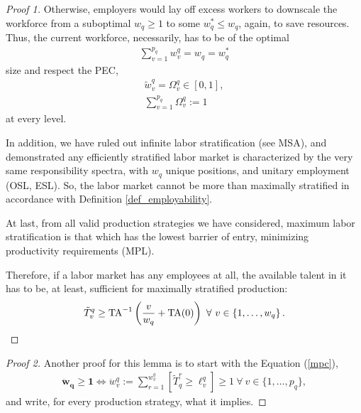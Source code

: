 \documentclass[hidelinks, nonatbib]{elsarticle}
\begin{document}
\begin{lemma}
\begin{proof}[Proof 1]
        Otherwise, employers would lay off excess workers to downscale the workforce from a suboptimal $w_q \geq 1$ to some $w_{q}^{*} \leq w_q$, again, to save resources. Thus, the current workforce, necessarily, has to be of the optimal
        \begin{gather}
        \sum_{v=1}^{p_q}
        w_{v}^{q}
        =
        w_q
        =
        w_{q}^{*}
        \end{gather}
        size and respect the PEC,
        \begin{gather}
        \tilde{w}_{v}^{q}
        =
        \Omega_{v}^{q}
        \in
        [0,1]
        ,
        \\
        \sum_{v=1}^{p_q}
        \Omega_{v}^{q}
        :=
        1
        \end{gather}
        at every level.
        
        In addition, we have ruled out infinite labor stratification (see MSA), and demonstrated any efficiently stratified labor market is characterized by the very same responsibility spectra, with $w_q$ unique positions, and unitary employment (OSL, ESL). So, the labor market cannot be more than maximally stratified in accordance with Definition \ref{def_employability}. 
        
        At last, from all valid production strategies we have considered, maximum labor stratification is that which has the lowest barrier of entry, minimizing productivity requirements (MPL).
        
        Therefore, if a labor market has any employees at all, the available talent in it has to be, at least, sufficient for maximally stratified production:
        \begin{gather}
            \tilde{T}_{v}^{q}
            \geq
            \text{TA}^{-1}\left(
                \frac{v}{w_q}
                +
                \text{TA}(0)
            \right)
            \
            \forall
            \
            v \in 
            \left\{
                1, \dots, w_q
            \right\}
            .
        \end{gather}
    \end{proof}

    \begin{proof}[Proof 2]
        Another proof for this lemma is to start with the Equation (\ref{mpc}),
        \begin{gather}
            \boldsymbol{\ddot{w}_q}
            \geq
            \boldsymbol{1}
            \iff
            \ddot{w}_{v}^{q}
            :=
            \sum_{r=1}^{w_{v}^{q}}
            [\tilde{T}_{q}^{r} \geq \ell_{v}^{q}]
            \geq
            1
            \
            \forall
            \
            v \in \{1, \dots, p_q\}
            ,
        \end{gather}
        and write, for every production strategy, what it implies. 


\end{proof}
\end{lemma}
\end{document}

